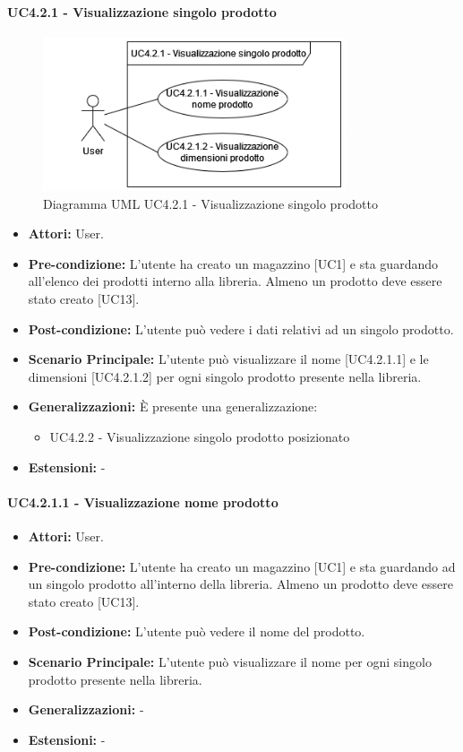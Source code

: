 \paragraph{UC4.2.1 - Visualizzazione singolo prodotto}
\begin{figure}[H]
  \centering
  \includegraphics[width=0.8\textwidth]{UC_diagrams_1-10/UC4.2.1.drawio.png}
   \caption{Diagramma UML UC4.2.1 - Visualizzazione singolo prodotto}
\end{figure}
\begin{itemize} 
    \item \textbf{Attori:} User.
    \item \textbf{Pre-condizione:}  L'utente ha creato un magazzino [UC1] e sta guardando all'elenco dei prodotti interno alla libreria. Almeno un prodotto deve essere stato creato [UC13].
    \item \textbf{Post-condizione:} L'utente può vedere i dati relativi ad un singolo prodotto.
    \item \textbf{Scenario Principale:} L'utente può visualizzare il nome [UC4.2.1.1] e le dimensioni [UC4.2.1.2] per ogni singolo prodotto presente nella libreria. 
    \item \textbf{Generalizzazioni:} È presente una generalizzazione:
    \begin{itemize}
        \item UC4.2.2 - Visualizzazione singolo prodotto posizionato
    \end{itemize}
    \item \textbf{Estensioni:} -
\end{itemize}


\paragraph{UC4.2.1.1 - Visualizzazione nome prodotto}
\begin{itemize} 
    \item \textbf{Attori:} User.
    \item \textbf{Pre-condizione:}  L'utente ha creato un magazzino [UC1] e sta guardando ad un singolo prodotto all'interno della libreria. Almeno un prodotto deve essere stato creato [UC13].
    \item \textbf{Post-condizione:} L'utente può vedere il nome del prodotto.
    \item \textbf{Scenario Principale:} L'utente può visualizzare il nome per ogni singolo prodotto presente nella libreria. 
    \item \textbf{Generalizzazioni:} -
    \item \textbf{Estensioni:} -
\end{itemize}


